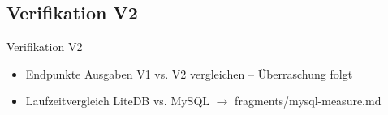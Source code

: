 \subsection{Verifikation V2} \label{sec:Ver2}
    Verifikation V2
    \begin{itemize}
        \item Endpunkte Ausgaben V1 vs. V2 vergleichen -- Überraschung folgt
        \item Laufzeitvergleich LiteDB vs. MySQL $\rightarrow$ fragments/mysql-measure.md
    \end{itemize}